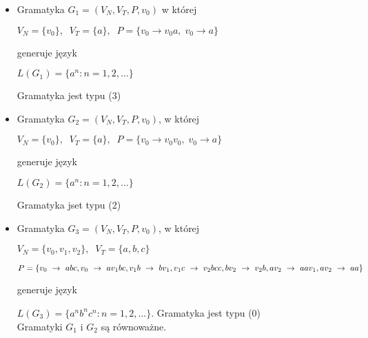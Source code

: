 \documentclass[main.tex]{subfiles}
\begin{document}
    \begin{itemize}
        \item Gramatyka $G_1 = (V_N,V_T,P,v_0)$ w której

        $V_N = \{v_0\}, \;\; V_T = \{a\}, \;\; P = \{ v_0 \rightarrow v_0a, \; v_0 \rightarrow a \}$

        generuje język

        $L(G_1) = \{ a^n : n = 1,2,... \}$

        Gramatyka jest typu (3)

        \item Gramatyka $G_2 = (V_N,V_T,P,v_0)$, w której

        $V_N = \{v_0\}, \;\; V_T = \{a\}, \;\; P = \{ v_0 \rightarrow v_0v_0, \; v_0 \rightarrow a \}$

        generuje język


        $L(G_2) = \{ a^n : n = 1,2,... \}$

        Gramatyka jset typu (2)


        \item Gramatyka $G_3 = (V_N,V_T,P,v_0)$, w której

        $V_N = \{v_0, v_1, v_2 \}, \;\; V_T = \{a,b,c\}$

        $P=\{v_0~\rightarrow~abc, v_0~\rightarrow~av_1bc, v_1b~\rightarrow~bv_1,v_1c~\rightarrow~v_2bcc, bv_2~\rightarrow~v_2b,  \\ av_2~\rightarrow~aav_1, av_2~\rightarrow~aa\}$

        generuje język

        $L(G_3) = \{ a^n b^n c^n : n = 1,2,... \}$.
        Gramatyka jest typu (0)
        \\

        Gramatyki $G_1$ i $G_2$ są równoważne.
    \end{itemize}

    \newpage
\end{document}
